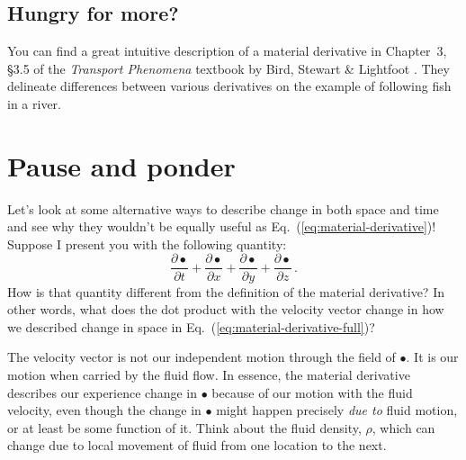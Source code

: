\vfill


\begin{mdframed}[style=exercise-frame]

\subsection*{Hungry for more?}

You can find a great intuitive description of a material derivative in Chapter~3, \S3.5 of the \textit{Transport Phenomena} textbook by Bird, Stewart \& Lightfoot \cite{bird2002transport}. They delineate differences between various derivatives on the example of following fish in a river.

\end{mdframed}

\section{Pause and ponder}

Let's look at some alternative ways to describe change in both space and time and see why they wouldn't be equally useful as Eq.~(\ref{eq:material-derivative})! Suppose I present you with the following quantity:
\begin{equation} \label{eq:all-derivatives}
\frac{\partial \bullet}{\partial t} + \frac{\partial \bullet}{\partial x} + \frac{\partial \bullet}{\partial y} + \frac{\partial \bullet}{\partial z} \, .
\end{equation}
How is that quantity different from the definition of the material derivative? In other words, what does the dot product with the velocity vector change in how we described change in space in Eq.~(\ref{eq:material-derivative-full})?



The velocity vector is not our independent motion through the field of $\bullet$. It is our motion when carried by the fluid flow. In essence, the material derivative describes our experience change in $\bullet$ because of our motion with the fluid velocity, even though the change in $\bullet$ might happen precisely \textit{due to} fluid motion, or at least be some function of it. Think about the fluid density, $\rho$, which can change due to local movement of fluid from one location to the next.



